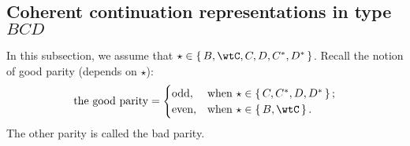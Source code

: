 \documentclass[12pt,a4paper]{amsart}
\numberwithin{equation}{section}
\theoremstyle{remark}
\def\Gc{G_\bC}
\def\ckstar{{\check \star}}
\begin{document}
\subsection{Coherent continuation representations in type $BCD$}
\label{sec:explicitCoh}

In this subsection, we assume that  %
$\star \in \set{B,\wtC, C,D,C^{*}, D^{*}}$.
Recall the notion of good parity (depends on $\star$):
\[
  \text{the good parity} =
\begin{cases}
 \text{odd}, & \text{when } \star \in \set{C,C^{*},D,D^{*}};\\
 \text{even}, & \text{when } \star \in \set{B,\wtC}.\\
\end{cases}
\]
The other parity is called the bad parity.
\end{document}

